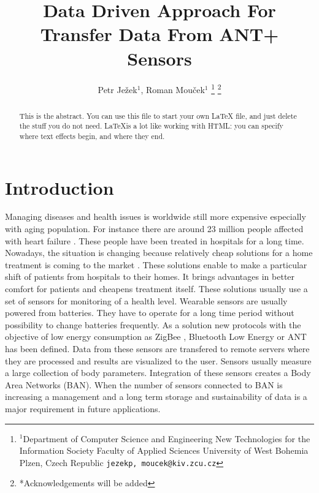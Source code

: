 \documentclass[conference]{IEEEconf}
\begin{document}
  \title{Data Driven Approach For Transfer Data  From ANT+ Sensors}

  \author{{Petr Je\v{z}ek$^{1}$, Roman Mou\v{c}ek$^{1}$}
\thanks{$^{1}$Department of Computer Science and Engineering
New Technologies for the Information Society
Faculty of Applied Sciences
University of West Bohemia
Plzen, Czech Republic
        {\tt\small {jezekp, moucek}@kiv.zcu.cz}}%
\thanks{*Acknowledgements will be added}%
}
\maketitle


\begin{abstract}
This is the abstract. You can use this file to start your own LaTeX file,
and just delete the stuff you do not need. \LaTeX  is a lot like working
with HTML: you can specify where text effects begin, and where they end.
\end{abstract}

\section{Introduction}\label{sec:intro}
Managing diseases and health issues is worldwide still more expensive especially with aging population. For instance there are around 23 million people affected with heart failure \cite{bui2011epidemiology}. These people have been treated in hospitals for a long time. Nowadays, the situation is changing because relatively cheap solutions for a home treatment is coming to the market \cite{4761985, 5333913}. These solutions enable to make a particular shift of patients from hospitals to their homes. It brings advantages in better comfort for patients and cheapens treatment itself.  These solutions usually use a set of sensors for monitoring of a health level. Wearable sensors are usually powered from batteries. They have to operate for a long time period without possibility to change batteries frequently. As a solution new protocols with the objective of low energy consumption as ZigBee \cite{Farahani:2008:ZWN:1457417}, Bluetooth Low Energy \cite{heydon2012bluetooth} or ANT \cite{zaloker2014ant} has been defined.  Data from these sensors are transfered to remote servers where they are processed and results are visualized to the user. Sensors usually measure a large collection of body parameters. Integration of these sensors creates a Body Area Networks (BAN). When the number of sensors connected to BAN is increasing a management and a long term storage and sustainability of data is a major requirement in future applications.
\end{document}
